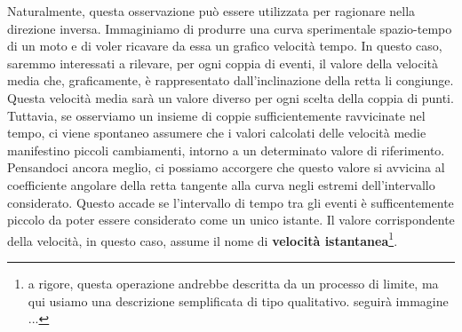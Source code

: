 Naturalmente, questa osservazione può essere utilizzata per ragionare nella direzione inversa.\newline
Immaginiamo di produrre una curva sperimentale spazio-tempo di un moto e di voler ricavare da essa un grafico velocità tempo. In questo caso, saremmo interessati a rilevare, per ogni coppia di eventi, il valore della velocità media che, graficamente, è rappresentato dall’inclinazione della retta li congiunge. Questa velocità media sarà un valore diverso per ogni scelta della coppia di punti.
Tuttavia, se osserviamo un insieme di coppie sufficientemente ravvicinate nel tempo, ci viene spontaneo assumere che i valori calcolati delle velocità medie manifestino piccoli cambiamenti, intorno a un determinato valore di riferimento.
Pensandoci ancora meglio, ci possiamo accorgere che questo valore si avvicina al coefficiente angolare della retta tangente alla curva negli estremi dell’intervallo considerato. Questo accade se l’intervallo di tempo tra gli eventi è sufficentemente piccolo da poter essere considerato come un unico istante. Il valore corrispondente della velocità, in questo caso, assume il nome di {\bf velocità istantanea}\footnote {a rigore, questa operazione andrebbe descritta da un processo di limite, ma qui usiamo una descrizione semplificata di tipo qualitativo. seguirà immagine ...}.

